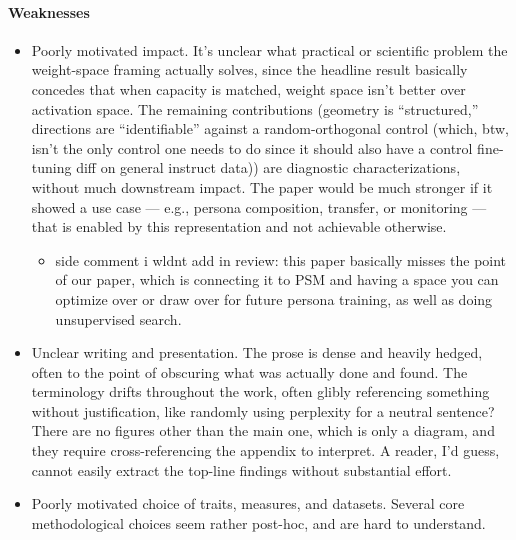 \paragraph{Weaknesses}
\begin{itemize}
  \item Poorly motivated impact. It's unclear what practical or scientific
  problem the weight-space framing actually solves, since the headline result
  basically concedes that when capacity is matched, weight space isn't better
  over activation space. The remaining contributions (geometry is
  ``structured,'' directions are ``identifiable'' against a random-orthogonal
  control (which, btw, isn't the only control one needs to do since it should
  also have a control fine-tuning diff on general instruct data)) are
  diagnostic characterizations, without much downstream impact. The paper would
  be much stronger if it showed a use case --- e.g., persona composition,
  transfer, or monitoring --- that is enabled by this representation and not
  achievable otherwise.
  \begin{itemize}
  \item side comment i wldnt add in review: this paper basically misses the
  point of our paper, which is connecting it to PSM and having a space you can
  optimize over or draw over for future persona training, as well as doing
  unsupervised search.
  \end{itemize}
  \item Unclear writing and presentation. The prose is dense and heavily
  hedged, often to the point of obscuring what was actually done and found. The
  terminology drifts throughout the work, often glibly referencing something
  without justification, like randomly using perplexity for a neutral sentence?
  There are no figures other than the main one, which is only a diagram, and
  they require cross-referencing the appendix to interpret. A reader, I'd
  guess, cannot easily extract the top-line findings without substantial
  effort.
  \item Poorly motivated choice of traits, measures, and datasets. Several core
  methodological choices seem rather post-hoc, and are hard to understand.
    \begin{itemize}


\end{itemize}
\end{itemize}
